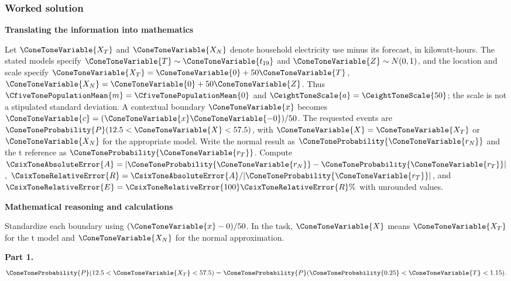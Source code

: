 \subsubsection*{Worked solution}\label{sol:c9-d3}
\par\textbf{Translating the information into mathematics}\par
Let $\ConeToneVariable{X_T}$ and $\ConeToneVariable{X_N}$ denote household electricity use minus its forecast, in kilowatt-hours. The stated models specify $\ConeToneVariable{T}\sim \ConeToneVariable{t_{19}}$ and $\ConeToneVariable{Z}\sim N(0,1)$, and the location and scale specify $\ConeToneVariable{X_T}=\ConeToneVariable{0}+50\ConeToneVariable{T}$, $\ConeToneVariable{X_N}=\ConeToneVariable{0}+50\ConeToneVariable{Z}$. Thus $\CfiveTonePopulationMean{m}=\CfiveTonePopulationMean{0}$ and $\CeightToneScale{a}=\CeightToneScale{50}$; the scale is not a stipulated standard deviation. A contextual boundary $\ConeToneVariable{x}$ becomes $\ConeToneVariable{c}=(\ConeToneVariable{x}\ConeToneVariable{-0})/50$. The requested events are $\ConeToneProbability{P}(12.5<\ConeToneVariable{X}<57.5)$, with $\ConeToneVariable{X}=\ConeToneVariable{X_T}$ or $\ConeToneVariable{X_N}$ for the appropriate model. Write the normal result as $\ConeToneProbability{\ConeToneVariable{r_N}}$ and the t reference as $\ConeToneProbability{\ConeToneVariable{r_T}}$. Compute $\CsixToneAbsoluteError{A}=|\ConeToneProbability{\ConeToneVariable{r_N}}-\ConeToneProbability{\ConeToneVariable{r_T}}|$, $\CsixToneRelativeError{R}=\CsixToneAbsoluteError{A}/|\ConeToneProbability{\ConeToneVariable{r_T}}|$, and $\CsixToneRelativeError{E}=\CsixToneRelativeError{100}\CsixToneRelativeError{R}\%$ with unrounded values.
\par\textbf{Mathematical reasoning and calculations}\par
Standardize each boundary using $(\ConeToneVariable{x}-0)/50$. In the task, $\ConeToneVariable{X}$ means $\ConeToneVariable{X_T}$ for the t model and $\ConeToneVariable{X_N}$ for the normal approximation.
\par\textbf{Part 1.}\[\ConeToneProbability{P}(12.5<\ConeToneVariable{X_T}<57.5)=\ConeToneProbability{P}(\ConeToneProbability{0.25}<\ConeToneVariable{T}<1.15).\]
